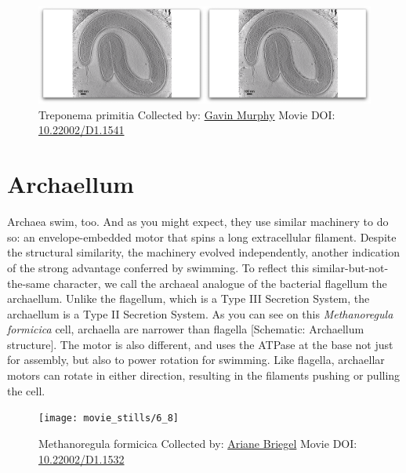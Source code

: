 \documentclass[]{tufte-book}
\begin{document}
\begin{figure}
\includegraphics{movie_stills/6_7a} \caption[Treponema primitia Collected by:
\protect\hyperlink{gavin_murphy}{Gavin Murphy} Movie DOI:
\href{https://doi.org/10.22002/D1.1541}{10.22002/D1.1541}]{Treponema primitia Collected by:
\protect\hyperlink{gavin_murphy}{Gavin Murphy} Movie DOI:
\href{https://doi.org/10.22002/D1.1541}{10.22002/D1.1541}}\label{fig:6-7a}
\end{figure}

\section{Archaellum}\label{archaellum}

Archaea swim, too. And as you might expect, they use similar machinery
to do so: an envelope-embedded motor that spins a long extracellular
filament. Despite the structural similarity, the machinery evolved
independently, another indication of the strong advantage conferred by
swimming. To reflect this similar-but-not-the-same character, we call
the archaeal analogue of the bacterial flagellum the archaellum. Unlike
the flagellum, which is a Type III Secretion System, the archaellum is a
Type II Secretion System. As you can see on this \emph{Methanoregula
formicica} cell, archaella are narrower than flagella {[}Schematic:
Archaellum structure{]}. The motor is also different, and uses the
ATPase at the base not just for assembly, but also to power rotation for
swimming. Like flagella, archaellar motors can rotate in either
direction, resulting in the filaments pushing or pulling the cell.





\begin{figure}
\texttt{[image: movie\_stills/6\_8]} \caption[Methanoregula formicica Collected by:
\protect\hyperlink{ariane_briegel}{Ariane Briegel} Movie DOI:
\href{https://doi.org/10.22002/D1.1532}{10.22002/D1.1532}]{Methanoregula formicica Collected by:
\protect\hyperlink{ariane_briegel}{Ariane Briegel} Movie DOI:
\href{https://doi.org/10.22002/D1.1532}{10.22002/D1.1532}}\label{fig:6-8}
\end{figure}
\end{document}

